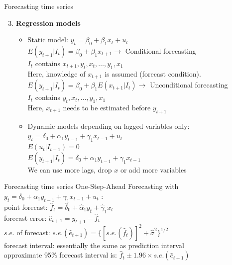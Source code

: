 \documentclass{beamer}
\begin{document}
\begin{frame}{Forecasting time series}
\begin{enumerate}
\setcounter{enumi}{2}
\item \textbf{Regression models}
\begin{itemize}
\item Static model: $y_t=\beta_0 + \beta_1 x_t + u_t$\\
$E(y_{t+1}|I_t)=\beta_0 + \beta_1 x_{t+1} \rightarrow$ Conditional forecasting\\
$I_t$ contains $x_{t+1}, y_t, x_t,\dots, y_1, x_1$\\
Here, knowledge of $x_{t+1}$ is assumed (forecast condition).\\
\medskip
$E(y_{t+1}|I_t)=\beta_0 + \beta_1 E(x_{t+1}|I_t) \rightarrow$ Unconditional forecasting\\
$I_t$ contains $y_t, x_t,\dots, y_1, x_1$\\
Here, $x_{t+1}$ needs to be estimated before $y_{t+1}$\\

\vspace{0.5cm}
\item Dynamic models depending on lagged variables only:\\
$y_t=\delta_0+\alpha_1 y_{t-1} + \gamma_1 x_{t-1} + u_t$\\
$E(u_t|I_{t-1})=0$\\
$E(y_{t+1}|I_t)=\delta_0+\alpha_1 y_{t-1} + \gamma_1 x_{t-1}$\\
We can use more lags, drop $x$ or add more variables
\end{itemize}
\end{enumerate}
\end{frame}


\begin{frame}{Forecasting time series}
One-Step-Ahead Forecasting with \\
\vspace{0.2cm}
$y_t=\delta_0+\alpha_1 y_{t-1} + \gamma_1 x_{t-1} + u_t $ :\\
\vspace{0.8cm}
point forecast: $\hat{f}_t = \hat{\delta}_0 + \hat{\alpha}_1 y_t + \hat{\gamma}_1 x_t$\\
\vspace{0.2cm}
forecast error: $\hat{e}_{t+1}=y_{t+1}-\hat{f}_t $\\
\vspace{0.2cm}
$\textit{s.e.}$ of forecast: $\textit{s.e.}(\hat{e}_{t+1})= \{ [\textit{s.e.} (\hat{f}_t)]^2+\hat{\sigma}^2\}^{1/2}$  \\
\vspace{0.82cm}
forecast interval: essentially the same as prediction interval \\
\vspace{0.2cm}
approximate 95\% forecast interval is:  $\hat{f}_t \pm 1.96 \! \times \! \textit{s.e.}(\hat{e}_{t+1})$
\end{frame}
\end{document}

